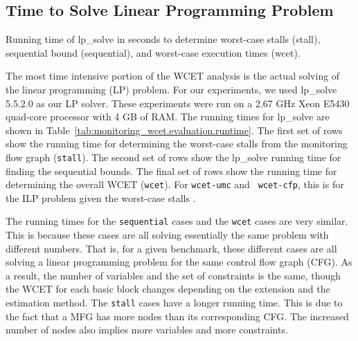 

\subsection{Time to Solve Linear Programming Problem}
\label{sec:monitoring_wcet.evaluation.lptime}

\begin{table}[htb]
  \begin{center}
    \begin{small}
    
    \end{small}
    \caption{Running time of lp\_solve in seconds to determine worst-case stalls
    (stall), sequential bound (sequential), and worst-case execution times (wcet).}
    \label{tab:monitoring_wcet.evaluation.runtime}
  \end{center}
\end{table}

The most time intensive portion of the WCET analysis is the actual solving of
the linear programming (LP) problem. For our experiments, we used lp\_solve
5.5.2.0 \cite{lpsolve} as our LP solver. These experiments were run on a 2.67
GHz Xeon E5430 quad-core processor with 4 GB of RAM. The running times for
lp\_solve are shown in Table~\ref{tab:monitoring_wcet.evaluation.runtime}.  The first set of rows
show the running time for determining the worst-case stalls from the monitoring flow
graph ({\tt stall}). The second set of rows show the lp\_solve running time for
finding the sequential bounds. The final set of rows show the running time for
determining the overall WCET ({\tt wcet}). For {\tt wcet-umc} and {\tt
wcet-cfp}, this is for the ILP problem given the worst-case stalls .

The running times for the {\tt sequential} cases and the {\tt wcet} cases are very
similar. This is because these cases are all solving essentially the same
problem with different numbers. That is, for a given benchmark, these different
cases are all solving a linear programming problem for the same control flow
graph (CFG). As a result, the number of variables and the set of
constraints is the same, though the WCET for each basic block changes depending
on the extension and the estimation method. The {\tt stall} cases have a longer
running time.
This is due to the fact that a MFG has more nodes than its corresponding CFG.
The increased number of nodes also implies more variables and more constraints.


